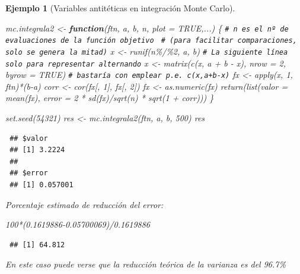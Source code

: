 \documentclass[
  10pt,
]{book}
\newenvironment{Shaded}{\begin{snugshade}}{\end{snugshade}}
\newcommand{\AttributeTok}[1]{\textcolor[rgb]{0.77,0.63,0.00}{#1}}
\newcommand{\CommentTok}[1]{\textcolor[rgb]{0.56,0.35,0.01}{\textit{#1}}}
\newcommand{\ConstantTok}[1]{\textcolor[rgb]{0.00,0.00,0.00}{#1}}
\newcommand{\ControlFlowTok}[1]{\textcolor[rgb]{0.13,0.29,0.53}{\textbf{#1}}}
\newcommand{\DecValTok}[1]{\textcolor[rgb]{0.00,0.00,0.81}{#1}}
\newcommand{\FloatTok}[1]{\textcolor[rgb]{0.00,0.00,0.81}{#1}}
\newcommand{\FunctionTok}[1]{\textcolor[rgb]{0.00,0.00,0.00}{#1}}
\newcommand{\NormalTok}[1]{#1}
\newcommand{\OtherTok}[1]{\textcolor[rgb]{0.56,0.35,0.01}{#1}}
\newcommand{\SpecialCharTok}[1]{\textcolor[rgb]{0.00,0.00,0.00}{#1}}
\theoremstyle{break}
\newtheorem{example}{Ejemplo}[chapter]
\theoremstyle{nonumberplain}
\renewcommand{\CommentTok}[1]{\textcolor[rgb]{0.41,0.41,0.41}{\texttt{#1}}}
\begin{document}
\begin{example}[Variables antitéticas en integración Monte Carlo]
\begin{Shaded}
\begin{Highlighting}[]
\NormalTok{mc.integrala2 }\OtherTok{\textless{}{-}} \ControlFlowTok{function}\NormalTok{(ftn, a, b, n, }\AttributeTok{plot =} \ConstantTok{TRUE}\NormalTok{,...) \{}
  \CommentTok{\# n es el nº de evaluaciones de la función objetivo }
  \CommentTok{\# (para facilitar comparaciones, solo se genera la mitad)}
\NormalTok{  x }\OtherTok{\textless{}{-}} \FunctionTok{runif}\NormalTok{(n}\SpecialCharTok{\%/\%}\DecValTok{2}\NormalTok{, a, b)}
  \CommentTok{\# La siguiente línea solo para representar alternando}
\NormalTok{  x }\OtherTok{\textless{}{-}} \FunctionTok{matrix}\NormalTok{(}\FunctionTok{c}\NormalTok{(x, a }\SpecialCharTok{+}\NormalTok{ b }\SpecialCharTok{{-}}\NormalTok{ x), }\AttributeTok{nrow =} \DecValTok{2}\NormalTok{, }\AttributeTok{byrow =} \ConstantTok{TRUE}\NormalTok{)}
  \CommentTok{\# bastaría con emplear p.e. c(x,a+b{-}x)}
\NormalTok{  fx }\OtherTok{\textless{}{-}} \FunctionTok{apply}\NormalTok{(x, }\DecValTok{1}\NormalTok{,  ftn)}\SpecialCharTok{*}\NormalTok{(b}\SpecialCharTok{{-}}\NormalTok{a)}
\NormalTok{  corr }\OtherTok{\textless{}{-}} \FunctionTok{cor}\NormalTok{(fx[, }\DecValTok{1}\NormalTok{], fx[, }\DecValTok{2}\NormalTok{])}
\NormalTok{  fx }\OtherTok{\textless{}{-}} \FunctionTok{as.numeric}\NormalTok{(fx)}
  \FunctionTok{return}\NormalTok{(}\FunctionTok{list}\NormalTok{(}\AttributeTok{valor =} \FunctionTok{mean}\NormalTok{(fx), }\AttributeTok{error =} \DecValTok{2} \SpecialCharTok{*} \FunctionTok{sd}\NormalTok{(fx)}\SpecialCharTok{/}\FunctionTok{sqrt}\NormalTok{(n) }\SpecialCharTok{*} \FunctionTok{sqrt}\NormalTok{(}\DecValTok{1} \SpecialCharTok{+}\NormalTok{ corr)))}
\NormalTok{\}}

\FunctionTok{set.seed}\NormalTok{(}\DecValTok{54321}\NormalTok{)}
\NormalTok{res }\OtherTok{\textless{}{-}} \FunctionTok{mc.integrala2}\NormalTok{(ftn, a, b, }\DecValTok{500}\NormalTok{)}
\NormalTok{res}
\end{Highlighting}
\end{Shaded}

\begin{verbatim}
 ## $valor
 ## [1] 3.2224
 ## 
 ## $error
 ## [1] 0.057001
\end{verbatim}

Porcentaje estimado de reducción del error:

\begin{Shaded}
\begin{Highlighting}[]
\DecValTok{100}\SpecialCharTok{*}\NormalTok{(}\FloatTok{0.1619886{-}0.05700069}\NormalTok{)}\SpecialCharTok{/}\FloatTok{0.1619886}
\end{Highlighting}
\end{Shaded}

\begin{verbatim}
 ## [1] 64.812
\end{verbatim}

En este caso puede verse que la reducción teórica de la varianza es del 96.7\%
\end{example}
\end{document}
